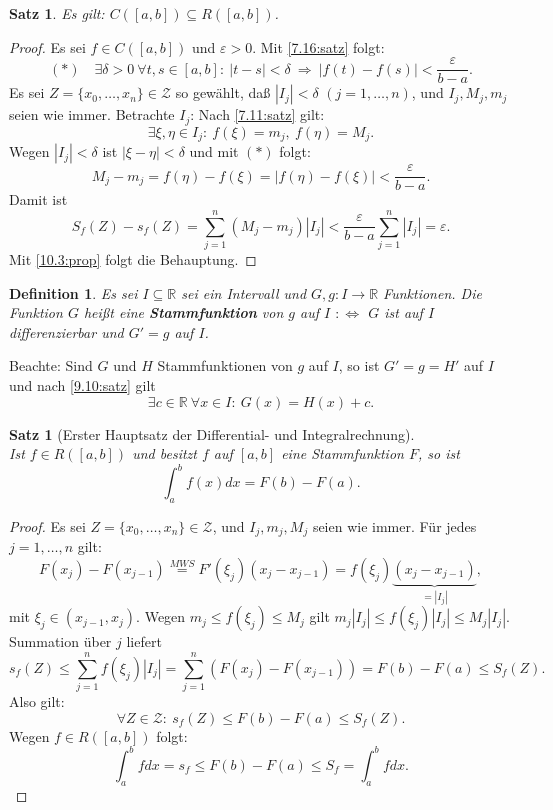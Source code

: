 \documentclass[12pt]{extreport} %
\newcommand{\R}{\mathbb{R}}
\theoremstyle{named}
\theoremstyle{itshape}
\newtheorem{satz}[unnamedtheorem]{Satz}
\newtheorem*{definition}{Definition}
\theoremstyle{normal}
\begin{document}
{\begin{satz} \label{10.5:satz}
	Es gilt: $C([a, b]) \subseteq R([a, b])$.
\end{satz}

\begin{proof}
	Es sei $f \in C([a, b])$ und $\varepsilon > 0$. Mit \ref{7.16:satz} folgt: 
	$$
	(\ast) \quad \exists \delta > 0~ \forall t, s \in [a, b]: ~ |t - s| < \delta ~ \Rightarrow  ~ |f(t) - f(s)| < \frac{\varepsilon}{b - a}.
	$$
	Es sei $Z = \{ x_{0}, \dotsc, x_{n} \} \in \mathcal{Z}$ so gewählt, da{\ss} $|I_{j}| < \delta$ $(j = 1, \dotsc, n)$, und $I_{j}, M_{j}, m_{j}$ seien wie immer.
	Betrachte $I_{j}$: Nach \ref{7.11:satz} gilt:
	$$ \exists \xi, \eta \in I_{j}: ~ f(\xi) = m_{j}, ~ f(\eta) = M_{j}. $$
	Wegen $|I_{j}| < \delta$ ist $|\xi - \eta| < \delta$ und mit $(\ast)$ folgt:
	$$ M_{j} - m_{j} = f(\eta) - f(\xi) = |f(\eta) - f(\xi)| < \frac{\varepsilon}{b - a}. $$
	Damit ist 
	$$S_{f}(Z) - s_{f}(Z) = \sum_{j=1}^{n} (M_{j} - m_{j}) |I_{j}| < \frac{\varepsilon}{b - a} \sum_{j=1}^{n} |I_{j}| = \varepsilon.$$
	Mit \ref{10.3:prop} folgt die Behauptung.
\end{proof}

\begin{definition}
	Es sei $I \subseteq \R$ sei ein Intervall und $G, g \colon I \rightarrow \R$ Funktionen. Die Funktion $G$ hei{\ss}t eine \textbf{Stammfunktion} von $g$ auf $I$ 
	$:\iff$ $G$ ist auf $I$ differenzierbar und $G' = g$ auf $I$.
\end{definition}


Beachte: Sind $G$ und $H$ Stammfunktionen von $g$ auf $I$, so ist $G' = g = H'$ auf $I$ und nach \ref{9.10:satz} gilt
$$\exists c \in \R ~ \forall x \in I: ~ G(x) = H(x) + c.$$

\begin{satz}[Erster Hauptsatz der Differential- und Integralrechnung]\label{10.6:prop-1Hauptsatz} ~\\
	Ist $f \in R([a, b])$ und besitzt $f$ auf $[a, b]$ eine Stammfunktion $F$, so ist 
	$$ \int_{a}^{b} f(x) dx = F(b) - F(a).$$
\end{satz}

\begin{proof}
	Es sei $Z = \{ x_{0}, \dotsc, x_{n} \} \in \mathcal{Z}$, und $I_{j}, m_{j}, M_{j}$ seien wie immer. Für jedes $j=1,\dotsc, n$ gilt:
	$$ F(x_{j}) - F(x_{j-1}) \overset{MWS}{=} F'(\xi_{j}) (x_{j} - x_{j-1}) = f(\xi_{j}) \underbrace{(x_{j} - x_{j-1})}_{ = |I_{j}|}, $$
	mit $\xi_{j} \in (x_{j-1}, x_{j})$. Wegen $m_{j} \leq f(\xi_{j}) \leq M_{j}$ gilt $m_{j} |I_{j}| \leq f(\xi_{j}) |I_{j}| \leq M_{j} |I_{j}|$. 
	Summation über $j$ liefert
	$$
	s_{f}(Z)  \leq \sum_{j=1}^{n} f(\xi_{j}) |I_{j}|  = \sum_{j=1}^{n} \left( F(x_{j}) - F(x_{j-1}) \right) = F(b) - F(a) \leq S_{f}(Z).
	$$
	Also gilt: 
	$$ \forall Z \in \mathcal{Z}: ~ s_{f}(Z) \leq F(b) - F(a) \leq S_{f}(Z).$$ 
	Wegen $f \in R([a, b])$ folgt: $$\int_{a}^{b} f dx = s_{f} \leq F(b) - F(a) \leq S_{f} = \int_{a}^{b} f dx.$$
\end{proof}

}
\end{document}
